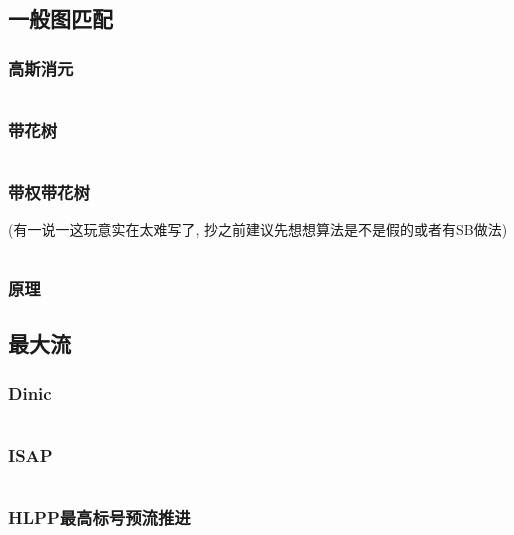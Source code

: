 \documentclass[a4paper]{article}
\begin{document}
\begin{multicols}{2}
			\subsection{一般图匹配}
				\subsubsection{高斯消元}
					\inputminted{cpp}{../src/graph/基于线性代数的一般图匹配.cpp}

				\subsubsection{带花树}
					\inputminted{cpp}{../src/graph/带花树.cpp}
				
				\subsubsection{带权带花树}
					(有一说一这玩意实在太难写了, 抄之前建议先想想算法是不是假的或者有SB做法)
					\inputminted{cpp}{../src/graph/带权带花树.cpp}
				
				\subsubsection{原理}
					

			
			



			\subsection{最大流}
				\subsubsection{Dinic}
					\inputminted{cpp}{../src/graph/Dinic.cpp}

				\subsubsection{ISAP}
					\inputminted{cpp}{../src/graph/ISAP.cpp}

				\subsubsection{HLPP最高标号预流推进}
					\inputminted{cpp}{../src/graph/HLPP.cpp}
			

\end{multicols}
\end{document}
